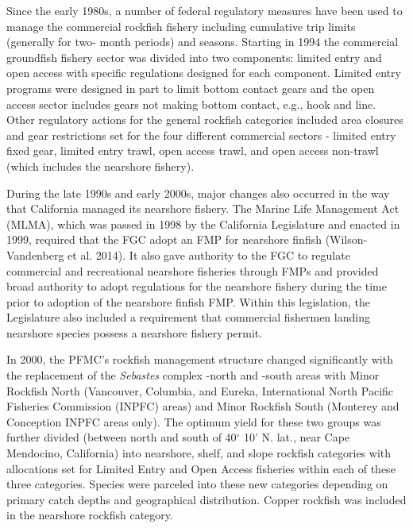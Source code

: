 \documentclass[11pt,
  english,
  letterpaper,
]{article}
\begin{document}
Since the early 1980s, a number of federal regulatory measures have been used to manage the commercial rockfish fishery including cumulative trip limits (generally for two- month periods) and seasons. Starting in 1994 the commercial groundfish fishery sector was divided into two components: limited entry and open access with specific regulations designed for each component. Limited entry programs were designed in part to limit bottom contact gears and the open access sector includes gears not making bottom contact, e.g., hook and line. Other regulatory actions for the general rockfish categories included area closures and gear restrictions set for the four different commercial sectors - limited entry fixed gear, limited entry trawl, open access trawl, and open access non-trawl (which includes the nearshore fishery).

During the late 1990s and early 2000s, major changes also occurred in the way that California managed its nearshore fishery. The Marine Life Management Act (MLMA), which was passed in 1998 by the California Legislature and enacted in 1999, required that the FGC adopt an FMP for nearshore finfish (Wilson-Vandenberg et al. 2014). It also gave authority to the FGC to regulate commercial and recreational nearshore fisheries through FMPs and provided broad authority to adopt regulations for the nearshore fishery during the time prior to adoption of the nearshore finfish FMP. Within this legislation, the Legislature also included a requirement that commercial fishermen landing nearshore species possess a nearshore fishery permit.

In 2000, the PFMC's rockfish management structure changed significantly with the replacement of the \emph{Sebastes} complex -north and -south areas with Minor Rockfish North (Vancouver, Columbia, and Eureka, International North Pacific Fisheries Commission (INPFC) areas) and Minor Rockfish South (Monterey and Conception INPFC areas only). The optimum yield for these two groups was further divided (between north and south of 40\(^\circ\) 10' N. lat., near Cape Mendocino, California) into nearshore, shelf, and slope rockfish categories with allocations set for Limited Entry and Open Access fisheries within each of these three categories. Species were parceled into these new categories depending on primary catch depths and geographical distribution. Copper rockfish was included in the nearshore rockfish category.
\end{document}
